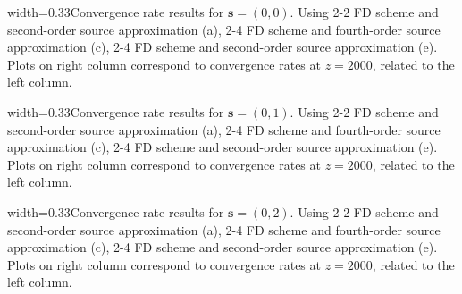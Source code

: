 
{width=0.33\textwidth}{Convergence rate results for ${\mathbf s}=(0,0)$. Using 2-2 FD scheme and second-order source approximation (a),  2-4 FD scheme and fourth-order source approximation (c), 2-4 FD scheme and second-order source approximation (e). Plots on right column correspond to convergence rates at $z=2000$, related to the left column.}

{width=0.33\textwidth}{Convergence rate results for ${\mathbf s}=(0,1)$. Using 2-2 FD scheme and second-order source approximation (a),  2-4 FD scheme and fourth-order source approximation (c), 2-4 FD scheme and second-order source approximation (e). Plots on right column correspond to convergence rates at $z=2000$, related to the left column.}

{width=0.33\textwidth}{Convergence rate results for ${\mathbf s}=(0,2)$. Using 2-2 FD scheme and second-order source approximation (a),  2-4 FD scheme and fourth-order source approximation (c), 2-4 FD scheme and second-order source approximation (e). Plots on right column correspond to convergence rates at $z=2000$, related to the left column.}

